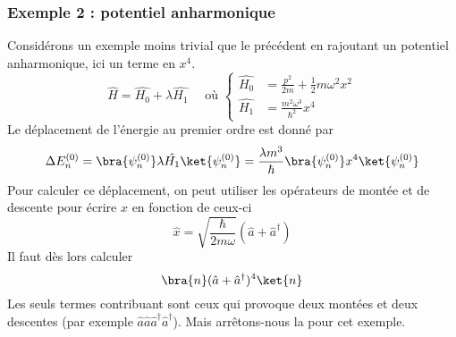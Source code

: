 			
			\subsubsection{Exemple 2 : potentiel anharmonique}
			Considérons un exemple moins trivial que le précédent en rajoutant un potentiel 
			anharmonique, ici un terme en $x^4$.
			\begin{equation}
			\hat{H} = \hat{H_0}+\lambda\hat{H_1}\quad\text{ où }\left\{\begin{array}{ll}
			\hat{H_0} &= \frac{p^2}{2m}+\frac{1}{2}m\omega^2x^2\\
			\hat{H_1} &= \frac{m^2\omega^3}{\hbar^2}x^4
			\end{array}\right.
			\end{equation}
			Le déplacement de l'énergie au premier ordre est donné par
			\begin{equation}
			\Delta E_n^{(0)} = \bra{\psi_n^{(0)}}\lambda\hat{H_1}\ket{\psi_n^{(0)}}  = \frac{\lambda m^3}{\hbar}
			\bra{\psi_n^{(0)}}x^4\ket{\psi_n^{(0)}}
			\end{equation}
			Pour calculer ce déplacement, on peut utiliser les opérateurs de montée et de descente pour 
			écrire $x$ en fonction de ceux-ci
			\begin{equation}
 			\hat{x} = \sqrt{\dfrac{\hbar}{2m\omega}}(\hat{a}+\hat{a}^\dagger)
			\end{equation}
			Il faut dès lors calculer
			\begin{equation}
			\bra{n}(\hat{a}+\hat{a}^\dagger)^4\ket{n}
			\end{equation}
			Les seuls termes contribuant sont ceux qui provoque deux montées et deux descentes (par exemple
			$\hat{a}\hat{a}\hat{a}^\dagger\hat{a}^\dagger$). Mais arrêtons-nous la pour cet exemple.\\
			
		
		
